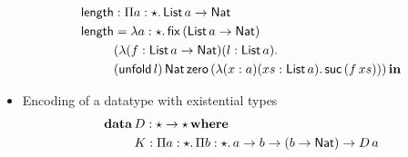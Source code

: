 \begin{itemize}
\begin{align*}
    \length &: \pai{a}{\star}{\List\,a \rightarrow \Nat} \\
    \length &= \lam{a}{\star}{\mathsf{fix}\,({\List\,a \rightarrow \Nat})\\
            &(\lambda(f : \List\,a \rightarrow \Nat)(l : \List\,a).\\
            &(\unfold[\List\,a]{l})\,\Nat\,\zero\,(\lambda(x : a)(xs : \List\,a).\,\suc\,(f\,xs)))}\,\inb
  \end{align*}
\item Encoding of a datatype with existential types
  \begin{align*}
    \data\,&D : \star \rightarrow \star\,\where \\
           &K : \pai{a}{\star}{\pai{b}{\star}{a \rightarrow b \rightarrow (b \rightarrow \Nat)} \rightarrow D\,a}
  \end{align*}
\end{itemize}



